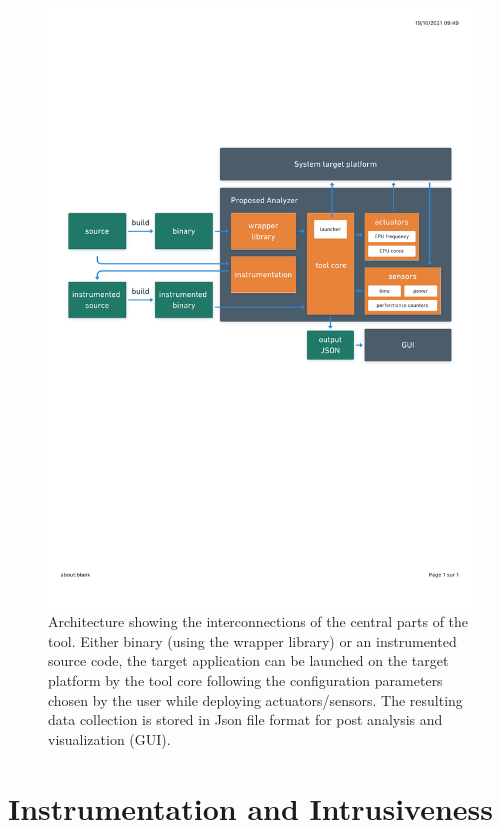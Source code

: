 \begin{figure}[H]	
	\includegraphics[scale=0.7]{pascalanalyzer/figures/designfeatures/pascal_philosophy.pdf}
	\caption{Architecture showing the interconnections of the central parts of the tool. Either binary (using the wrapper library) or an instrumented source code, the target application can be launched on the target platform by the tool core following the configuration parameters chosen by the user while deploying actuators/sensors. The resulting data collection is stored in Json file format for post analysis and visualization (GUI). \label{fig:pascal_architecture}}
\end{figure} 

\section{Instrumentation and Intrusiveness} \label{sec:instrumentation_and_intrusiveness}

